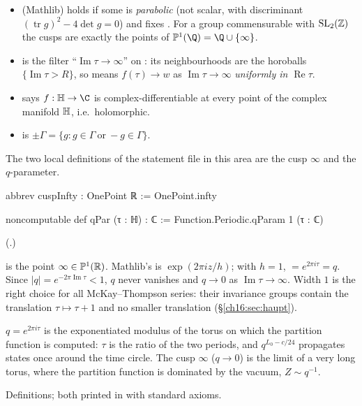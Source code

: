 \begin{itemize}
  encodes ``infinite''.  So $H\cap K$ has finite index in both $H$ and $K$.
\item {} (Mathlib) holds if some  is \emph{parabolic} (not scalar, with discriminant
  $(\operatorname{tr}g)^2-4\det g=0$) and fixes .  For a group commensurable with $\mathrm{SL}_2(\mathbb{Z})$ the cusps are
  exactly the points of $\chsixteenP(\Q)=\Q\cup\{\infty\}$.
\item {} is the filter ``$\operatorname{Im}\tau\to\infty$'' on : its neighbourhoods are the
  horoballs $\{\operatorname{Im}\tau>R\}$, so  means $f(\tau)\to w$ as
  $\operatorname{Im}\tau\to\infty$ \emph{uniformly in $\operatorname{Re}\tau$}.
\item {} says $f:\chsixteenH\to\C$ is complex-differentiable at every point of the
  complex manifold $\mathbb{H}$, i.e.\ holomorphic.
\item {} is $\pm\Gamma=\{g: g\in\Gamma\ \text{or}\ -g\in\Gamma\}$.
\end{itemize}
The two local definitions of the statement file in this area are the cusp $\infty$ and the $q$-parameter.
\begin{leancode}
abbrev cuspInfty : OnePoint ℝ := OnePoint.infty

noncomputable def qPar (τ : ℍ) : ℂ := Function.Periodic.qParam 1 (τ : ℂ)
\end{leancode}
(.)
\begin{dictionary}
 is the point $\infty\in\mathbb{P}^1(\mathbb{R})$.  Mathlib's  is
$\exp(2\pi i z/h)$; with $h=1$,  $=e^{2\pi i\tau}=q$.  Since $|q|=e^{-2\pi\operatorname{Im}\tau}<1$, $q$
never vanishes and $q\to0$ as $\operatorname{Im}\tau\to\infty$.  Width $1$ is the right choice for all
McKay--Thompson series: their invariance groups contain the translation $\tau\mapsto\tau+1$ and no smaller translation
(\S\ref{ch16:sec:haupt}).
\end{dictionary}
\begin{physics}
$q=e^{2\pi i\tau}$ is the exponentiated modulus of the torus on which the partition function is computed: $\tau$ is
the ratio of the two periods, and $q^{L_0-c/24}$ propagates states once around the time circle.  The cusp $\infty$
($q\to0$) is the limit of a very long torus, where the partition function is dominated by the vacuum, $Z\sim q^{-1}$.
\end{physics}
\begin{status}
Definitions; both printed in  with standard axioms.
\end{status}

